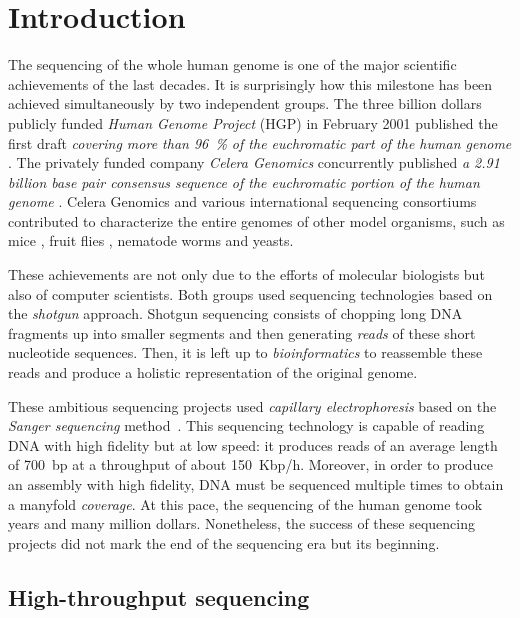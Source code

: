 \chapter{Introduction}

The sequencing of the whole human genome is one of the major scientific achievements of the last decades.
It is surprisingly how this milestone has been achieved simultaneously by two independent groups.
The three billion dollars publicly funded \emph{Human Genome Project} (HGP) in February 2001 published the first draft \emph{covering more than 96~\% of the euchromatic part of the human genome} \citep{Consortium2001}.
The privately funded company \emph{Celera Genomics} concurrently published \emph{a 2.91 billion base pair consensus sequence of the euchromatic portion of the human genome} \citep{Venter2001}.
Celera Genomics and various international sequencing consortiums contributed to characterize the entire genomes of other model organisms, such as mice \citep{Chinwalla2002}, fruit flies \citep{Myers2000}, nematode worms \citep{Sulston1992} and yeasts.

These achievements are not only due to the efforts of molecular biologists but also of computer scientists.
Both groups used sequencing technologies based on the \emph{shotgun} approach.
Shotgun sequencing consists of chopping long DNA fragments up into smaller segments and then generating \emph{reads} of these short nucleotide sequences.
Then, it is left up to \emph{bioinformatics} to reassemble these reads and produce a holistic representation of the original genome.

These ambitious sequencing projects used \emph{capillary electrophoresis} based on the \emph{Sanger sequencing} method~\citep{Sanger1977}.
This sequencing technology is capable of reading DNA with high fidelity but at low speed: it produces reads of an average length of 700~bp at a throughput of about 150~Kbp/h.
Moreover, in order to produce an assembly with high fidelity, DNA must be sequenced multiple times to obtain a manyfold \emph{coverage}.
At this pace, the sequencing of the human genome took years and many million dollars.
Nonetheless, the success of these sequencing projects did not mark the end of the sequencing era but its beginning.


\section{High-throughput sequencing}

